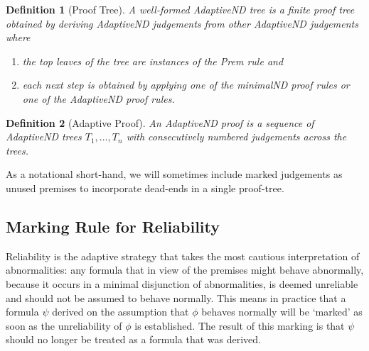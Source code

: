 \documentclass[]{article}
\newtheorem{definition}{Definition}
\begin{document}
\begin{definition}[Proof Tree]
A well-formed {\sf AdaptiveND} tree is a finite proof tree obtained by deriving {\sf AdaptiveND} judgements from other {\sf AdaptiveND} judgements where
\begin{enumerate}

\item the top leaves of the tree are instances of the {\sf Prem} rule and
\item each next step is obtained by applying one of the {\sf minimalND} proof rules or one of the {\sf AdaptiveND} proof rules.
\end{enumerate}
\end{definition}

\begin{definition}[Adaptive Proof]
An {\sf AdaptiveND} proof is a sequence of {\sf AdaptiveND} trees $T_{1}, \dots, T_{n}$ with consecutively numbered judgements across the trees.
\end{definition}

As a notational short-hand, we will sometimes include marked judgements as unused premises to incorporate dead-ends in a single proof-tree.


\subsection{Marking Rule for Reliability}\label{sec:markrel}

Reliability is the adaptive strategy that takes the most cautious interpretation of abnormalities: any formula that in view of the premises might behave abnormally, because it occurs in a minimal disjunction of abnormalities, is deemed unreliable and should not be assumed to behave normally. This means in practice that a formula $\psi$ derived on the assumption that $\phi$ behaves normally will be `marked' as soon as the unreliability of $\phi$ is established. The result of this marking is that $\psi$ should no longer be treated as a formula that was derived.

\end{document}
